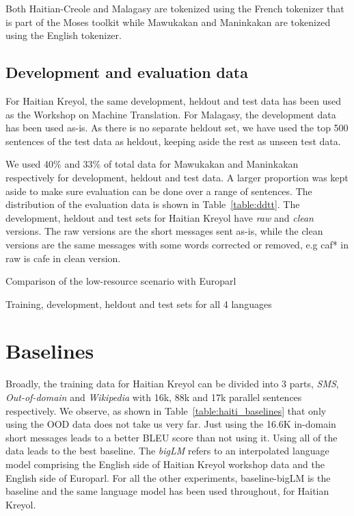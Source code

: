    Both Haitian-Creole and Malagasy are tokenized using the French tokenizer that is part of the Moses toolkit while Mawukakan and Maninkakan are tokenized using the English tokenizer.

\subsection{Development and evaluation data}
	For Haitian Kreyol, the same development, heldout and test data has been used as the Workshop on Machine Translation. For Malagasy, the development data has been used as-is. As there is no separate heldout set, we have used the top 500 sentences of the test data as heldout, keeping aside the rest as unseen test data. 

	We used 40\% and 33\% of total data for Mawukakan and Maninkakan respectively for development, heldout and test data. A larger proportion was kept aside to make sure evaluation can be done over a range of sentences. The distribution of the evaluation data is shown in Table~\ref{table:ddtt}. The development, heldout and test sets for Haitian Kreyol have \emph{raw} and \emph{clean} versions. The raw versions are the short messages sent as-is, while the clean versions are the same messages with some words corrected or removed, e.g caf* in raw is cafe in clean version. 


\begin{table}
	\small
	\centering
	
	\caption{Comparison of the low-resource scenario with Europarl}
	\label{table:datasettings}
\end{table}


\begin{table}
         \small
         \centering
         
         \caption{Training, development, heldout and test sets for all 4 languages}
         \label{table:ddtt}
\end{table}



\section{Baselines}
\label{sec:baselines}
Broadly, the training data for Haitian Kreyol can be divided into 3 parts, \emph{SMS}, \emph{Out-of-domain} and \emph{Wikipedia} with 16k, 88k and 17k parallel sentences respectively. We observe, as shown in Table~\ref{table:haiti_baselines} that only using the OOD data does not take us very far. Just using the 16.6K in-domain short messages leads to a better BLEU score than not using it. Using all of the data leads to the best baseline. The \emph{bigLM} refers to an interpolated language model comprising the English side of Haitian Kreyol workshop data and the English side of Europarl. For all the other experiments, baseline-bigLM is the baseline and the same language model has been used throughout, for Haitian Kreyol. 

